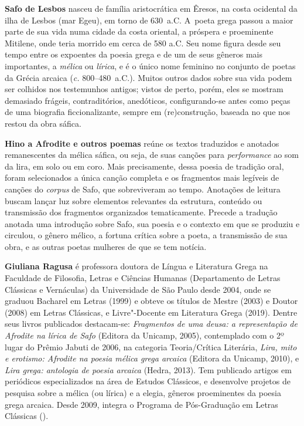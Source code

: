 \textbf{Safo de Lesbos} nasceu de família aristocrática em Êresos, na costa ocidental da ilha de Lesbos
(mar Egeu), em torno de 630~a.C. A~poeta grega passou a maior parte de
sua vida numa cidade da costa oriental, a próspera e proeminente Mitilene, onde
teria morrido em cerca de 580 a.C. Seu nome figura desde seu tempo entre os
expoentes da poesia grega e de um de seus gêneros mais importantes, a
\textit{mélica} ou \textit{lírica}, e é o único nome feminino no conjunto de
poetas da Grécia arcaica (\textit{c.} 800--480~a.C.). Muitos outros dados sobre
sua vida podem ser colhidos nos testemunhos antigos; vistos de perto, porém,
eles se mostram demasiado frágeis, contraditórios, anedóticos, configurando-se
antes como peças de uma biografia ficcionalizante, sempre em (re)construção,
baseada no que nos restou da obra sáfica.

\textbf{Hino a Afrodite e outros poemas} reúne os textos traduzidos e anotados 
remanescentes da mélica sáfica, ou seja, de suas canções para \textit{performance} 
ao som da lira, em solo ou em coro. Mais precisamente, dessa poesia de
tradição oral, foram selecionados a única canção completa e os fragmentos mais legíveis  
de canções do \textit{corpus} de Safo, que sobreviveram ao tempo. 
Anotações de leitura buscam lançar luz sobre elementos
relevantes da estrutura, conteúdo ou transmissão dos fragmentos organizados
tematicamente. Precede a tradução anotada uma introdução sobre Safo, sua poesia
e o contexto em que se produziu e circulou, o gênero mélico, a fortuna crítica
sobre a poeta, a transmissão de sua obra, e as outras poetas mulheres de que
se tem notícia. 

\textbf{Giuliana Ragusa} é professora doutora de Língua e Literatura Grega na Faculdade
de Filosofia, Letras e Ciências Humanas (Departamento de Letras Clássicas e
Vernáculas) da Universidade de São Paulo desde 2004, onde se graduou Bacharel
em Letras (1999) e obteve os títulos de Mestre (2003) e Doutor (2008) em Letras
Clássicas, e Livre"-Docente em Literatura Grega (2019). Dentre seus livros publicados destacam-se: 
\textit{Fragmentos de uma deusa: a representação de Afrodite
na lírica de Safo} (Editora da Unicamp, 2005), contemplado com o 2º lugar do 
Prêmio Jabuti de 2006, na categoria Teoria/Crítica Literária,
\textit{Lira, mito e erotismo: Afrodite na poesia mélica grega arcaica} (Editora da Unicamp, 2010), e \emph{Lira grega: antologia de poesia arcaica} (Hedra, 2013). 
Tem publicado artigos em periódicos especializados na
área de Estudos Clássicos, e desenvolve projetos de pesquisa sobre a mélica (ou lírica) e a elegia, gêneros proeminentes da poesia grega arcaica. Desde 2009, integra o Programa de Pós-Graduação em Letras Clássicas ().



